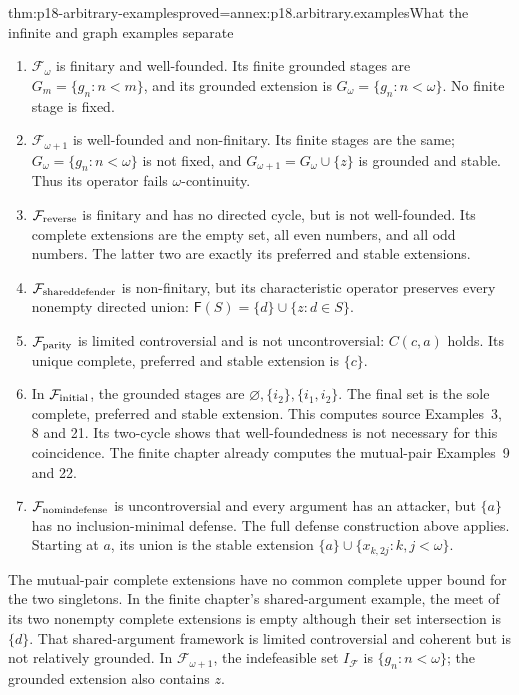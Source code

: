 \begin{hbtheorem}{thm:p18-arbitrary-examples}{proved=annex:p18.arbitrary.examples}{What the infinite and graph examples separate}
\begin{enumerate}
\item \(\mathcal F_\omega\) is finitary and well-founded.
      Its finite grounded stages are
      \(G_m=\{g_n:n<m\}\), and its grounded
      extension is \(G_\omega=\{g_n:n<\omega\}\).
      No finite stage is fixed.
\item \(\mathcal F_{\omega+1}\) is well-founded and
      non-finitary. Its finite stages are the same;
      \(G_\omega=\{g_n:n<\omega\}\) is not fixed,
      and \(G_{\omega+1}=G_\omega\cup\{z\}\)
      is grounded and stable. Thus its operator
      fails \(\omega\)-continuity.
\item \(\mathcal F_{\rm reverse}\) is finitary and
      has no directed cycle, but is not well-founded.
      Its complete extensions are the empty set,
      all even numbers, and all odd numbers.
      The latter two are exactly its preferred
      and stable extensions.
\item \(\mathcal F_{\rm shareddefender}\) is non-finitary,
      but its characteristic operator preserves
      every nonempty directed union:
      \(\mathsf F(S)=\{d\}\cup\{z:d\in S\}\).
\item \(\mathcal F_{\rm parity}\) is limited controversial
      and is not uncontroversial: \(C(c,a)\) holds.
      Its unique complete, preferred and stable
      extension is \(\{c\}\).
\item In \(\mathcal F_{\rm initial}\), the grounded
      stages are \(\varnothing,\{i_2\},\{i_1,i_2\}\).
      The final set is the sole complete,
      preferred and stable extension. This
      computes source Examples~3, 8 and 21.
      Its two-cycle shows that well-foundedness
      is not necessary for this coincidence.
      The finite chapter already computes
      the mutual-pair Examples~9 and 22.
\item \(\mathcal F_{\rm nomindefense}\) is uncontroversial
      and every argument has an attacker, but
      \(\{a\}\) has no inclusion-minimal defense.
      The full defense construction above applies.
      Starting at \(a\), its union is the stable
      extension \(\{a\}\cup\{x_{k,2j}:k,j<\omega\}\).
\end{enumerate}
The mutual-pair complete extensions have no
common complete upper bound for the two singletons.
In the finite chapter's shared-argument example,
the meet of its two nonempty complete extensions
is empty although their set intersection is
\(\{d\}\). That shared-argument framework is
limited controversial and coherent but is
not relatively grounded.
In \(\mathcal F_{\omega+1}\), the indefeasible
set \(I_{\mathcal F}\) is \(\{g_n:n<\omega\}\);
the grounded extension also contains \(z\).
\end{hbtheorem}

